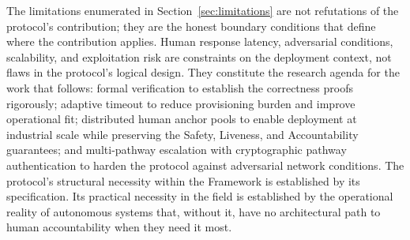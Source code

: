 The limitations enumerated in Section~\ref{sec:limitations} are not refutations of the protocol's contribution; they are the honest boundary conditions that define where the contribution applies. Human response latency, adversarial conditions, scalability, and exploitation risk are constraints on the deployment context, not flaws in the protocol's logical design. They constitute the research agenda for the work that follows: formal verification to establish the correctness proofs rigorously; adaptive timeout to reduce provisioning burden and improve operational fit; distributed human anchor pools to enable deployment at industrial scale while preserving the Safety, Liveness, and Accountability guarantees; and multi-pathway escalation with cryptographic pathway authentication to harden the protocol against adversarial network conditions. The protocol's structural necessity within the \bxthree{} Framework is established by its specification. Its practical necessity in the field is established by the operational reality of autonomous systems that, without it, have no architectural path to human accountability when they need it most.
